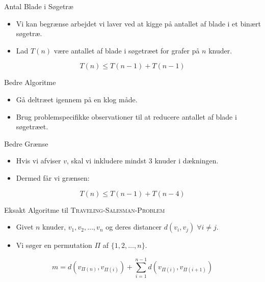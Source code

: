 \begin{frame}{Antal Blade i Søgetræ}
    \begin{itemize}
        \item Vi kan begrænse arbejdet vi laver ved at kigge på antallet af blade i et binært søgetræ.
        \item Lad $T(n)$ være antallet af blade i søgetræet for grafer på $n$ knuder.
    \end{itemize}
    \begin{equation*}
        T(n) \le T(n-1) + T(n-1)
    \end{equation*}
\end{frame}

\begin{frame}{Bedre Algoritme}
    \begin{itemize}
        \item Gå deltræet igennem på en klog måde.
        \item Brug problemspecifikke observationer til at reducere antallet af blade i søgetræet.
    \end{itemize}
\end{frame}

\begin{frame}{Bedre Grænse}
    \begin{itemize}
        \item Hvis vi afviser $v$, skal vi inkludere mindst 3 knuder i dækningen.
        \item Dermed får vi grænsen:
    \end{itemize}
    \begin{equation*}
        T(n) \le T(n-1) + T(n-4)
    \end{equation*}
\end{frame}

\begin{frame}{Eksakt Algoritme til \textsc{Traveling-Salesman-Problem}}
    \begin{itemize}
        \item Givet $n$ knuder, $v_{1}, v_{2}, \ldots, v_{n}$ og deres distancer $d(v_{i}, v_{j}) \; \forall i \ne j$.
        \item Vi søger en permutation \(\Pi\) af $\{1,2, \ldots, n\}$.
    \end{itemize}
    \begin{equation}
        m = d(v_{\Pi(n)}, v_{\Pi(i)}) + \sum_{i=1}^{n-1}  d(v_{\Pi(i)}, v_{\Pi(i+1)})
    \end{equation}
\end{frame}

